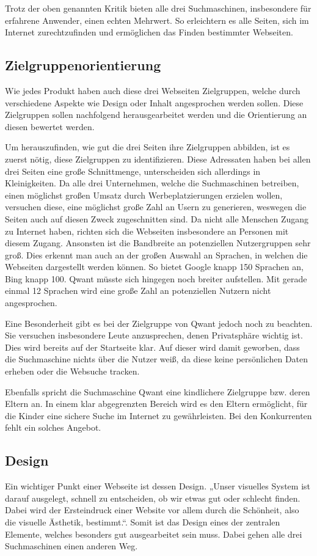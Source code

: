 Trotz der oben genannten Kritik bieten alle drei Suchmaschinen, insbesondere für erfahrene Anwender, einen echten Mehrwert.
So erleichtern es alle Seiten, sich im Internet zurechtzufinden und ermöglichen das Finden bestimmter Webseiten.

\subsection{Zielgruppenorientierung}
Wie jedes Produkt haben auch diese drei Webseiten Zielgruppen, welche durch verschiedene Aspekte wie Design oder Inhalt
angesprochen werden sollen. Diese Zielgruppen sollen nachfolgend herausgearbeitet werden und die Orientierung an diesen
bewertet werden.

Um herauszufinden, wie gut die drei Seiten ihre Zielgruppen abbilden, ist es zuerst nötig, diese Zielgruppen zu
identifizieren. Diese Adressaten haben bei allen drei Seiten eine große Schnittmenge, unterscheiden sich allerdings in
Kleinigkeiten. Da alle drei Unternehmen, welche die Suchmaschinen betreiben, einen möglichst großen Umsatz durch Werbeplatzierungen
erzielen wollen, versuchen diese, eine möglichst große Zahl an Usern zu generieren, weswegen die Seiten auch auf diesen Zweck
zugeschnitten sind.  Da nicht alle Menschen Zugang zu Internet haben, richten sich die Webseiten insbesondere an Personen
mit diesem Zugang. Ansonsten ist die Bandbreite an potenziellen Nutzergruppen sehr groß. Dies erkennt man auch an der großen
Auswahl an Sprachen, in welchen die Webseiten dargestellt werden können. So bietet Google knapp 150 Sprachen an, Bing
knapp 100. Qwant müsste sich hingegen noch breiter aufstellen. Mit gerade einmal 12 Sprachen wird eine große Zahl an
potenziellen Nutzern nicht angesprochen.

Eine Besonderheit gibt es bei der Zielgruppe von Qwant jedoch noch zu beachten. Sie versuchen insbesondere Leute anzusprechen,
denen Privatsphäre wichtig ist. Dies wird bereits auf der Startseite klar. Auf dieser wird damit geworben, dass die Suchmaschine
nichts über die Nutzer weiß, da diese keine persönlichen Daten erheben oder die Websuche tracken.

Ebenfalls spricht die Suchmaschine Qwant eine kindlichere Zielgruppe bzw. deren Eltern an. In einem klar abgegrenzten
Bereich wird es den Eltern ermöglicht, für die Kinder eine sichere Suche im Internet zu gewährleisten. Bei den Konkurrenten
fehlt ein solches Angebot.

\subsection{Design}
Ein wichtiger Punkt einer Webseite ist dessen Design. „Unser visuelles System ist darauf ausgelegt, schnell zu entscheiden,
ob wir etwas gut oder schlecht finden. Dabei wird der Ersteindruck einer Website vor allem durch die Schönheit, also die
visuelle Ästhetik, bestimmt.“\autocite[Seite 43]{Thielsch.}.
Somit ist das Design eines der zentralen Elemente, welches besonders gut ausgearbeitet sein muss.
Dabei gehen alle drei Suchmaschinen einen anderen Weg.

